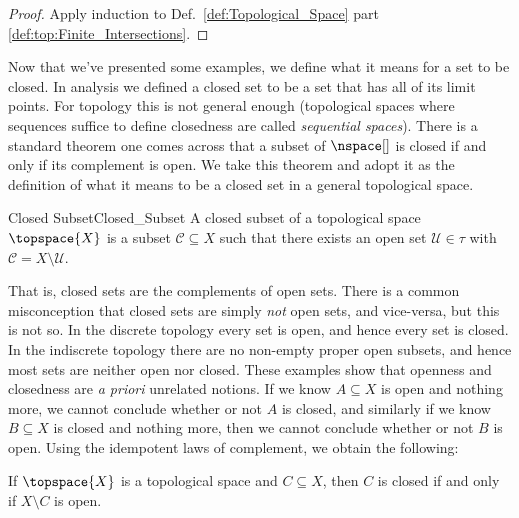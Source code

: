 \documentclass{book}                                                           %
\begin{document}
                \begin{proof}
                    Apply induction to Def.~\ref{def:Topological_Space}
                    part \ref{def:top:Finite_Intersections}.
                \end{proof}
                Now that we've presented some examples, we define what it means
                for a set to be closed. In analysis we
                defined a closed set to be a set that has all of its limit
                points. For topology this is not general enough (topological
                spaces where sequences suffice to define closedness are called
                \textit{sequential spaces}). There is a
                standard theorem one comes across that a subset of $\nspace[]$
                is closed if and only if its complement is open. We take this
                theorem and adopt it as the definition of what it means to be a
                closed set in a general topological space.
                \begin{fdefinition}{Closed Subset}{Closed_Subset}
                    A closed subset of a topological space $\topspace{X}$ is a
                    subset $\mathcal{C}\subseteq{X}$ such that there exists an
                    open set $\mathcal{U}\in\tau$ with
                    $\mathcal{C}=X\setminus\mathcal{U}$.%
                \end{fdefinition}
                That is, closed sets are the complements of open sets. There is
                a common misconception that closed sets are simply \textit{not}
                open sets, and vice-versa, but this is not so. In the discrete
                topology every set is open, and hence every set is closed. In
                the indiscrete topology there are no non-empty proper open
                subsets, and hence most sets are neither open nor closed. These
                examples show that openness and closedness are
                \textit{a priori} unrelated notions. If we know $A\subseteq{X}$
                is open and nothing more, we cannot conclude whether or not $A$
                is closed, and similarly if we know $B\subseteq{X}$ is closed
                and nothing more, then we cannot conclude whether or not $B$ is
                open. Using the idempotent laws of complement, we obtain the
                following:
                \begin{theorem}
                    \label{thm:Closed_Iff_Comp_is_Open}%
                    If $\topspace{X}$ is a topological space and
                    $C\subseteq{X}$, then $C$ is closed if and only if
                    $X\setminus{C}$ is open.
                \end{theorem}
\end{document}
